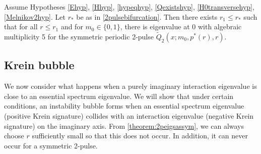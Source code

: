 \documentclass[thesis.tex]{subfiles}
\begin{document}
\begin{theorem}\label{theorem:2peigssym}
Assume Hypotheses \ref{Ehyp}, \ref{Hhyp}, \ref{hypeqhyp}, \ref{Qexistshyp}, \ref{H0transversehyp}, \ref{Melnikov2hyp}. Let $r_*$ be as in \cref{2pulsebifurcation}. Then there exists $r_1 \leq r_*$ such that for all $r \leq r_1$ and for $m_0 \in \{0, 1\}$, there is eigenvalue at 0 with algebraic multiplicity 5 for the symmetric periodic 2-pulse $\tilde{Q}_2(x; m_0, p^*(r), r)$.
\end{theorem}

\subsection{Krein bubble}

We now consider what happens when a purely imaginary interaction eigenvalue is close to an essential spectrum eigenvalue. We will show that under certain conditions, an instability bubble forms when an essential spectrum eigenvalue (positive Krein signature) collides with an interaction eigenvalue (negative Krein signature) on the imaginary axis. From \cref{theorem:2peigsassym}, we can always choose $r$ sufficiently small so that this does not occur. In addition, it can never occur for a symmetric 2-pulse. 
\end{document}
